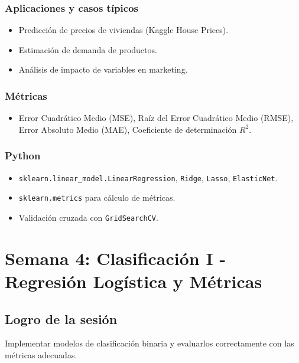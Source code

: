 \documentclass[12pt,a4paper,openany,oneside]{book}
\begin{document}
\subsection{Aplicaciones y casos típicos}
\begin{itemize}
    \item Predicción de precios de viviendas (Kaggle House Prices).
    \item Estimación de demanda de productos.
    \item Análisis de impacto de variables en marketing.
\end{itemize}

\subsection{Métricas}
\begin{itemize}
    \item Error Cuadrático Medio (MSE), Raíz del Error Cuadrático Medio (RMSE), Error Absoluto Medio (MAE), Coeficiente de determinación \(R^2\).
\end{itemize}

\subsection{Python}
\begin{itemize}
    \item \texttt{sklearn.linear\_model.LinearRegression}, \texttt{Ridge}, \texttt{Lasso}, \texttt{ElasticNet}.
    \item \texttt{sklearn.metrics} para cálculo de métricas.
    \item Validación cruzada con \texttt{GridSearchCV}.
\end{itemize}

\chapter{Semana 4: Clasificación I - Regresión Logística y Métricas}

\section{Logro de la sesión}
Implementar modelos de clasificación binaria y evaluarlos correctamente con las métricas adecuadas.
\end{document}
